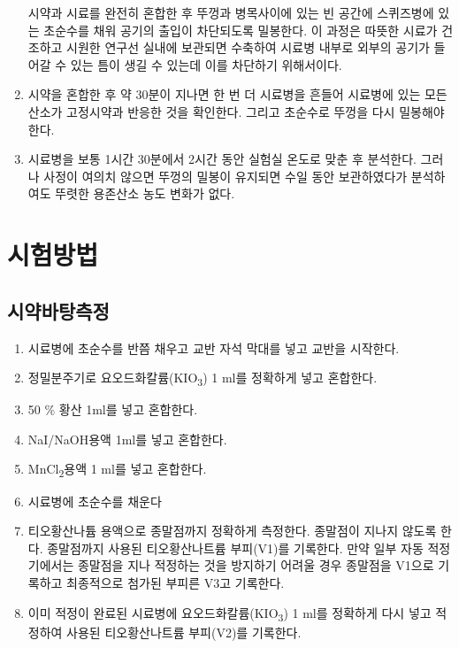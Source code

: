 \documentclass[
]{book}
\providecommand{\tightlist}{%
  \setlength{\itemsep}{0pt}\setlength{\parskip}{0pt}}
\begin{document}
\begin{enumerate}
  시약과 시료를 완전히 혼합한 후 뚜껑과 병목사이에 있는 빈 공간에 스퀴즈병에 있는 초순수를 채워 공기의 출입이 차단되도록 밀봉한다. 이 과정은 따뜻한 시료가 건조하고 시원한 연구선 실내에 보관되면 수축하여 시료병 내부로 외부의 공기가 들어갈 수 있는 틈이 생길 수 있는데 이를 차단하기 위해서이다.
\item
  시약을 혼합한 후 약 30분이 지나면 한 번 더 시료병을 흔들어 시료병에 있는 모든 산소가 고정시약과 반응한 것을 확인한다. 그리고 초순수로 뚜껑을 다시 밀봉해야 한다.
\item
  시료병을 보통 1시간 30분에서 2시간 동안 실험실 온도로 맞춘 후 분석한다. 그러나 사정이 여의치 않으면 뚜껑의 밀봉이 유지되면 수일 동안 보관하였다가 분석하여도 뚜렷한 용존산소 농도 변화가 없다.
\end{enumerate}

\hypertarget{uxc2dcuxd5d8uxbc29uxbc95}{%
\chapter{시험방법}\label{uxc2dcuxd5d8uxbc29uxbc95}}

\hypertarget{uxc2dcuxc57duxbc14uxd0d5uxce21uxc815}{%
\section{시약바탕측정}\label{uxc2dcuxc57duxbc14uxd0d5uxce21uxc815}}

\begin{enumerate}
\def\labelenumi{\arabic{enumi}.}
\tightlist
\item
  시료병에 초순수를 반쯤 채우고 교반 자석 막대를 넣고 교반을 시작한다.
\item
  정밀분주기로 요오드화칼륨(KIO\textsubscript{3}) 1 ml를 정확하게 넣고 혼합한다.
\item
  50 \% 황산 1ml를 넣고 혼합한다.
\item
  NaI/NaOH용액 1ml를 넣고 혼합한다.
\item
  MnCl\textsubscript{2}용액 1 ml를 넣고 혼합한다.
\item
  시료병에 초순수를 채운다
\item
  티오황산나튬 용액으로 종말점까지 정확하게 측정한다. 종말점이 지나지 않도록 한다. 종말점까지 사용된 티오황산나트륨 부피(V1)를 기록한다. 만약 일부 자동 적정기에서는 종말점을 지나 적정하는 것을 방지하기 어려울 경우 종말점을 V1으로 기록하고 최종적으로 첨가된 부피른 V3고 기록한다.
\item
  이미 적정이 완료된 시료병에 요오드화칼륨(KIO\textsubscript{3}) 1 ml를 정확하게 다시 넣고 적정하여 사용된 티오황산나트륨 부피(V2)를 기록한다.
\end{enumerate}
\end{document}
